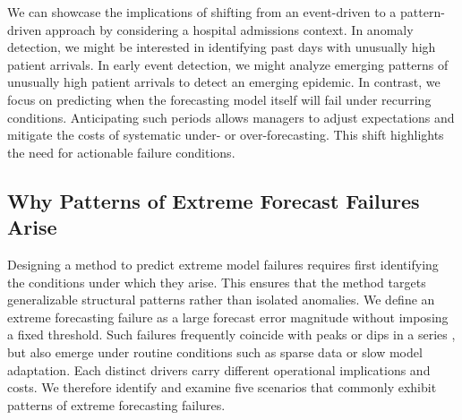 \documentclass[]{interact}
\theoremstyle{definition}
\begin{document}
We can showcase the implications of shifting from an event-driven to a pattern-driven approach by considering a hospital admissions context.  In anomaly detection, we might be
interested in identifying past days with unusually high patient arrivals. %
In early event detection, we might analyze emerging patterns of unusually high patient arrivals to detect an emerging epidemic. In contrast, we focus on predicting when the forecasting model itself will fail under recurring conditions. Anticipating such periods allows managers to adjust expectations and mitigate the costs of systematic under- or over-forecasting. This shift highlights the need for actionable failure conditions.

\subsection{Why Patterns of Extreme Forecast Failures Arise}%

Designing a method to predict extreme model failures requires first identifying the conditions under which they arise. This ensures that the method targets generalizable structural patterns rather than isolated anomalies. We define an extreme forecasting failure as a large forecast error magnitude without imposing a fixed threshold.  Such failures frequently coincide with peaks or dips in a series \citep{marvin2022}, but also emerge under routine conditions such as sparse data or slow model adaptation. Each distinct drivers carry different operational implications and costs. We therefore identify and examine five scenarios that commonly exhibit patterns of extreme forecasting failures.

\end{document}
